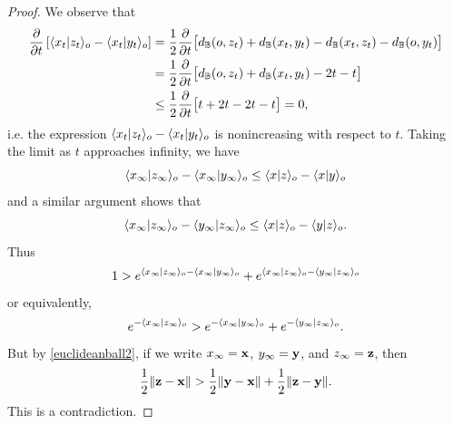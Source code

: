 \begin{proof}
We observe that
\begin{align*}
\frac{\del}{\del t}\left[\lb x_t|z_t\rb_\zero - \lb x_t|y_t\rb_\zero\right]
&= \frac12 \frac{\del}{\del t}\bigl[\dist_\B(\zero,z_t) + \dist_\B(x_t,y_t) - \dist_\B(x_t,z_t) - \dist_\B(\zero,y_t)\bigr]\\
&= \frac12 \frac{\del}{\del t}\bigl[\dist_\B(\zero,z_t) + \dist_\B(x_t,y_t) - 2t - t\bigr]\\
&\leq \frac12 \frac{\del}{\del t}\bigl[t + 2t - 2t - t\bigr] = 0,
\end{align*}
i.e. the expression $\langle x_t|z_t\rangle_o - \langle x_t|y_t\rangle_o$ is nonincreasing with respect to $t$. Taking the limit as $t$ approaches infinity, we have
\[
\langle x_\infty|z_\infty\rangle_o - \langle x_\infty|y_\infty\rangle_o \leq \langle x|z\rangle_o - \langle x|y\rangle_o
\]
and a similar argument shows that
\[
\langle x_\infty|z_\infty\rangle_o - \langle y_\infty|z_\infty\rangle_o \leq \langle x|z\rangle_o - \langle y|z\rangle_o.
\]
Thus
\[
1 > e^{\langle x_\infty|z_\infty\rangle_o - \langle x_\infty|y_\infty\rangle_o} + e^{\langle x_\infty|z_\infty\rangle_o - \langle y_\infty|z_\infty\rangle_o}
\]
or equivalently,
\[
e^{-\langle x_\infty|z_\infty\rangle_o} > e^{-\langle x_\infty|y_\infty\rangle_o} + e^{-\langle y_\infty|z_\infty\rangle_o}.
\]
But by \eqref{euclideanball2}, if we write $x_\infty = \mathbf x$, $y_\infty = \mathbf y$, and $z_\infty = \mathbf z$, then
\[
\frac12\|\mathbf z - \mathbf x\| > \frac12\|\mathbf y - \mathbf x\| + \frac12\|\mathbf z - \mathbf y\|.
\]
This is a contradiction.
\end{proof}

